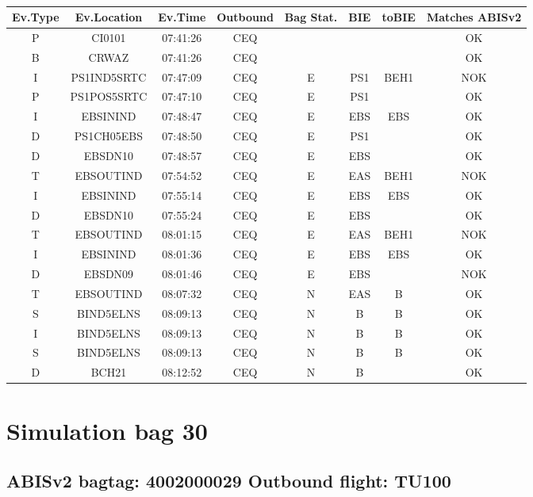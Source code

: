 \documentclass{report}
\begin{document}
\paragraph{}
\begin{longtable}{cccccccc}    \toprule
\rowcolor{white!50}
\textbf{Ev.Type} & \textbf{Ev.Location} & \textbf{Ev.Time} & \textbf{Outbound} & \textbf{Bag Stat.} & \textbf{BIE} & \textbf{toBIE} & \textbf{Matches ABISv2} \\\midrule
P & CI0101 & 07:41:26  & CEQ &  &  &  & OK\\
B & CRWAZ & 07:41:26  & CEQ &  &  &  & OK\\
I & PS1IND5SRTC & 07:47:09  & CEQ & E & PS1 & BEH1 & NOK\\
P & PS1POS5SRTC & 07:47:10  & CEQ & E & PS1 &  & OK\\
I & EBSININD & 07:48:47  & CEQ & E & EBS & EBS & OK\\
D & PS1CH05EBS & 07:48:50  & CEQ & E & PS1 &  & OK\\
D & EBSDN10 & 07:48:57  & CEQ & E & EBS &  & OK\\
T & EBSOUTIND & 07:54:52  & CEQ & E & EAS & BEH1 & NOK\\
I & EBSININD & 07:55:14  & CEQ & E & EBS & EBS & OK\\
D & EBSDN10 & 07:55:24  & CEQ & E & EBS &  & OK\\
T & EBSOUTIND & 08:01:15  & CEQ & E & EAS & BEH1 & NOK\\
I & EBSININD & 08:01:36  & CEQ & E & EBS & EBS & OK\\
D & EBSDN09 & 08:01:46  & CEQ & E & EBS &  & NOK\\
T & EBSOUTIND & 08:07:32  & CEQ & N & EAS & B & OK\\
S & BIND5ELNS & 08:09:13  & CEQ & N & B & B & OK\\
I & BIND5ELNS & 08:09:13  & CEQ & N & B & B & OK\\
S & BIND5ELNS & 08:09:13  & CEQ & N & B & B & OK\\
D & BCH21 & 08:12:52  & CEQ & N & B &  & OK\\
\bottomrule
\end{longtable}
\pagebreak
\section*{Simulation bag 30}
\subsection*{ABISv2 bagtag: 4002000029 Outbound flight: TU100}
\end{document}
